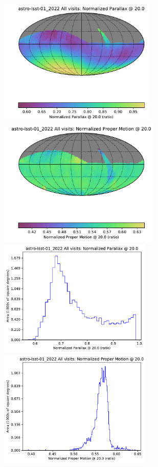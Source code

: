\documentclass[DM,lsstdraft,authoryear,toc]{lsstdoc}
\begin{document}
\begin{figure}[htb]
\centering
\includegraphics[height=2.4in]{figures/astro-lsst-01_2022_Normalized_Parallax_@_20_0_All_visits_HEAL_SkyMap}
\includegraphics[height=2.4in]{figures/astro-lsst-01_2022_Normalized_Proper_Motion_@_20_0_All_visits_HEAL_SkyMap} \\
\includegraphics[height=2.2in]{figures/astro-lsst-01_2022_Normalized_Parallax_@_20_0_All_visits_HEAL_Histogram}
\includegraphics[height=2.2in]{figures/astro-lsst-01_2022_Normalized_Proper_Motion_@_20_0_All_visits_HEAL_Histogram}

\end{figure}
\end{document}

